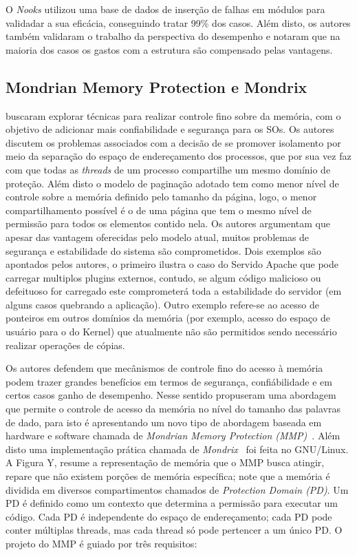 O \emph{Nooks} utilizou uma base de dados de inserção de falhas em módulos para
validadar a sua eficácia, conseguindo tratar 99\% dos casos. Além disto, os
autores também validaram o trabalho da perspectiva do desempenho e notaram que
na maioria dos casos os gastos com a estrutura são compensado pelas vantagens.

\subsection{Mondrian Memory Protection e Mondrix}

\cite{mmp} buscaram explorar técnicas para realizar controle fino sobre da
memória, com o objetivo de adicionar mais confiabilidade e segurança para os
SOs. Os autores discutem os problemas associados com a decisão de se promover
isolamento por meio da separação do espaço de endereçamento dos processos, que
por sua vez faz com que todas as \emph{threads} de um processo compartilhe um
mesmo domínio de proteção. Além disto o modelo de paginação adotado tem como
menor nível de controle sobre a memória definido pelo tamanho da página, logo,
o menor compartilhamento possível é o de uma página que tem o mesmo nível de
permissão para todos os elementos contido nela. Os autores argumentam que
apesar das vantagem oferecidas pelo modelo atual, muitos problemas de segurança
e estabilidade do sistema são comprometidos. Dois exemplos são apontados pelos
autores, o primeiro ilustra o caso do Servido Apache que pode carregar multiplos
plugins externos, contudo, se algum código malicioso ou defeituoso for carregado
este comprometerá toda a estabilidade do servidor (em alguns casos quebrando
a aplicação). Outro exemplo refere-se ao acesso de ponteiros em outros domínios
da memória (por exemplo, acesso do espaço de usuário para o do Kernel) que
atualmente não são permitidos sendo necessário realizar operações de cópias.


Os autores defendem que mecânismos de controle fino do acesso à memória podem
trazer grandes benefícios em termos de segurança, confiábilidade e em certos
casos ganho de desempenho. Nesse sentido \cite{mmp} propuseram uma abordagem
que permite o controle de acesso da memória no nível do tamanho das palavras de
dado, para isto é apresentando um novo tipo de abordagem baseada em hardware e
software chamada de \emph{Mondrian Memory Protection (MMP)}~\citep{mmp}. Além
disto uma implementação prática chamada de \emph{Mondrix}~\cite{mondrix} foi
feita no GNU/Linux. A Figura Y, resume a representação de memória que o MMP
busca atingir, repare que não existem porções de memória específica; note que a
memória é dividida em diversos compartimentos chamados de \emph{Protection
Domain (PD)}. Um PD é definido como um contexto que determina a permissão para
executar um código. Cada PD é independente do espaço de endereçamento; cada PD
pode conter múltiplas threads, mas cada thread só pode pertencer a um único PD.
O projeto do MMP é guiado por três requisitos:

